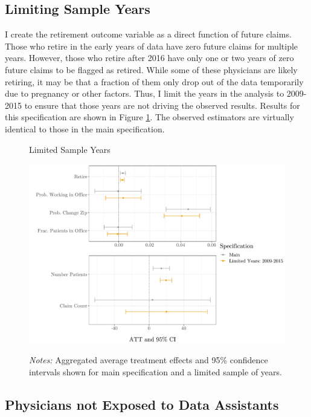 \documentclass[12pt]{article}
\begin{document}
\subsection{Limiting Sample Years}\label{app:years}

I create the retirement outcome variable as a direct function of future claims. Those who retire in the early years of data have zero future claims for multiple years. However, those who retire after 2016 have only one or two years of zero future claims to be flagged as retired. While some of these physicians are likely retiring, it may be that a fraction of them only drop out of the data temporarily due to pregnancy or other factors. Thus, I limit the years in the analysis to 2009-2015 to ensure that those years are not driving the observed results. Results for this specification are shown in Figure \ref{fig:years}. The observed estimators are virtually identical to those in the main specification. 

\begin{figure}[ht]
    \centering
    \captionsetup{width=.57\linewidth}
    \caption{Limited Sample Years}
    \includegraphics[scale=.57]{Objects/years_graph.pdf}
    \label{fig:years}
    \vspace{2mm}
    \caption*{\footnotesize{\textit{Notes:} Aggregated average treatment effects and 95\% confidence intervals shown for main specification and a limited sample of years.}}
\end{figure}

\subsection{Physicians not Exposed to Data Assistants}\label{app:DA}
\end{document}
